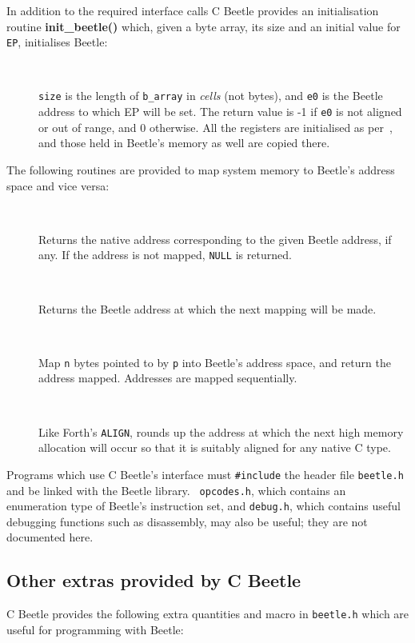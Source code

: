 \documentclass[english]{article}
\newlength{\ifacewidth}\ifacewidth=\textwidth \advance\ifacewidth by -0.1in
\newlength{\innerwidth}\innerwidth=\ifacewidth \advance\innerwidth by -0.5in
\newcommand{\ifacec}[2]{\item[]\parbox{\ifacewidth}{\hspace*{2.5mm}{\tt #1}\\[0.5ex]\hspace*{0.4in}\parbox{\innerwidth}{#2}}}
\begin{document}
In addition to the required interface calls C Beetle provides an initialisation routine {\bf init\_beetle()} which, given a byte array, its size and an initial value for {\tt EP}, initialises Beetle:

\begin{description}
\ifacec{int init\_beetle(BYTE *b\_array, long size, UCELL e0)}{{\tt size} is
the length of {\tt b\_array} in {\em cells} (not bytes), and {\tt e0} is the
Beetle address to which EP will be set. The return value is -1 if {\tt e0} is
not aligned or out of range, and 0 otherwise. All the registers are
initialised as per~\cite{beetle}, and those held in Beetle's memory as well
are copied there.}
\end{description}

The following routines are provided to map system memory to Beetle’s address space and vice versa:

\begin{description}
\ifacec{uint8\_t *native\_addr(UCELL addr)}{Returns the native address corresponding to the given Beetle address, if any. If the address is not mapped, {\tt NULL} is returned.}
\ifacec{UCELL himem\_here()}{Returns the Beetle address at which the next mapping will be made.}
\ifacec{UCELL himem\_allot(void *p, size\_t n)}{Map {\tt n} bytes pointed to by {\tt p} into Beetle’s address space, and return the address mapped. Addresses are mapped sequentially.}
\ifacec{UCELL himem\_align(void)}{Like Forth’s {\tt ALIGN}, rounds up the address at which the next high memory allocation will occur so that it is suitably aligned for any native C type.}
\end{description}

Programs which use C Beetle's interface must {\tt \#include} the header file
{\tt beetle.h} and be linked with the Beetle library. {\tt
opcodes.h}, which contains an enumeration type of Beetle's instruction set,
and {\tt debug.h}, which contains useful debugging functions such as
disassembly, may also be useful; they are not documented here.


\subsection{Other extras provided by C Beetle}

C Beetle provides the following extra quantities and macro in {\tt beetle.h}
which are useful for programming with Beetle:
\end{document}
